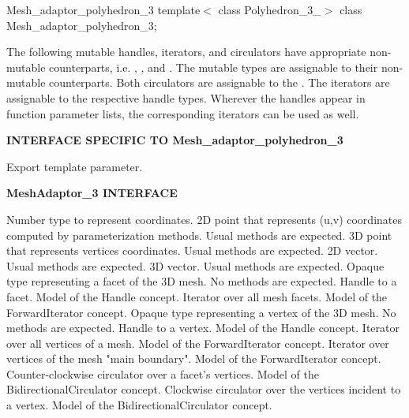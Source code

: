 \begin{ccRefClass}{Mesh_adaptor_polyhedron_3}
template$<$
class Polyhedron\_3\_$>$ 
class Mesh\_adaptor\_polyhedron\_3;


\ccTypes

The following mutable handles, iterators, and circulators have appropriate
non-mutable counterparts, i.e. ,
, and . The mutable types are
assignable to their non-mutable counterparts.  Both circulators are
assignable to the . The iterators are
assignable to the respective handle types. Wherever the handles appear
in function parameter lists, the corresponding iterators can be used as
well.

{\bf INTERFACE SPECIFIC TO Mesh\_adaptor\_polyhedron\_3}

{
Export template parameter.
}

{\bf MeshAdaptor\_3 INTERFACE}

{
Number type to represent coordinates.
}
{
2D point that represents (u,v) coordinates computed by parameterization methods. Usual methods are expected.
}
{
3D point that represents vertices coordinates. Usual methods are expected.
}
{
2D vector. Usual methods are expected.
}
{
3D vector. Usual methods are expected.
}
{
Opaque type representing a facet of the 3D mesh. No methods are expected.
}
{
Handle to a facet. Model of the Handle concept.
}
{
}
{
Iterator over all mesh facets. Model of the ForwardIterator concept.
}
{
}
{
Opaque type representing a vertex of the 3D mesh. No methods are expected.
}
{
Handle to a vertex. Model of the Handle concept.
}
{
}
{
Iterator over all vertices of a mesh. Model of the ForwardIterator concept.
}
{
}
{
Iterator over vertices of the mesh "main boundary". Model of the ForwardIterator concept.
}
{
}
{
Counter-clockwise circulator over a facet's vertices. Model of the BidirectionalCirculator concept.
}
{
}
{
Clockwise circulator over the vertices incident to a vertex. Model of the BidirectionalCirculator concept.
}
{
}



\end{ccRefClass}
